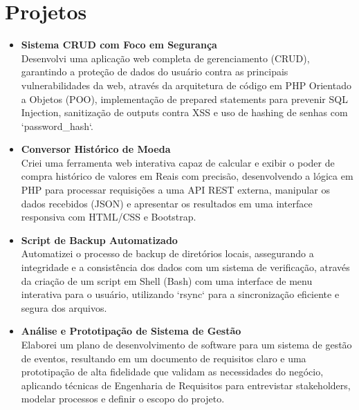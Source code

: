 \documentclass[a4paper,12pt]{article}
\begin{document}

\section*{Projetos}
\begin{itemize}[noitemsep, nolistsep, leftmargin=*, itemsep=8pt]
    \item 
        \textbf{Sistema CRUD com Foco em Segurança} \\
        Desenvolvi uma aplicação web completa de gerenciamento (CRUD), garantindo a proteção de dados do usuário contra as principais vulnerabilidades da web, através da arquitetura de código em PHP Orientado a Objetos (POO), implementação de prepared statements para prevenir SQL Injection, sanitização de outputs contra XSS e uso de hashing de senhas com `password\_hash`.

    \item 
        \textbf{Conversor Histórico de Moeda} \\
        Criei uma ferramenta web interativa capaz de calcular e exibir o poder de compra histórico de valores em Reais com precisão, desenvolvendo a lógica em PHP para processar requisições a uma API REST externa, manipular os dados recebidos (JSON) e apresentar os resultados em uma interface responsiva com HTML/CSS e Bootstrap.

    \item 
        \textbf{Script de Backup Automatizado} \\
        Automatizei o processo de backup de diretórios locais, assegurando a integridade e a consistência dos dados com um sistema de verificação, através da criação de um script em Shell (Bash) com uma interface de menu interativa para o usuário, utilizando `rsync` para a sincronização eficiente e segura dos arquivos.
        
    \item 
        \textbf{Análise e Prototipação de Sistema de Gestão} \\
        Elaborei um plano de desenvolvimento de software para um sistema de gestão de eventos, resultando em um documento de requisitos claro e uma prototipação de alta fidelidade que validam as necessidades do negócio, aplicando técnicas de Engenharia de Requisitos para entrevistar stakeholders, modelar processos e definir o escopo do projeto.
\end{itemize}
\end{document}
